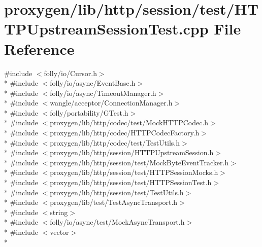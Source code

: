 \section{proxygen/lib/http/session/test/\+H\+T\+T\+P\+Upstream\+Session\+Test.cpp File Reference}
\label{HTTPUpstreamSessionTest_8cpp}
{\ttfamily \#include $<$folly/io/\+Cursor.\+h$>$}\\*
{\ttfamily \#include $<$folly/io/async/\+Event\+Base.\+h$>$}\\*
{\ttfamily \#include $<$folly/io/async/\+Timeout\+Manager.\+h$>$}\\*
{\ttfamily \#include $<$wangle/acceptor/\+Connection\+Manager.\+h$>$}\\*
{\ttfamily \#include $<$folly/portability/\+G\+Test.\+h$>$}\\*
{\ttfamily \#include $<$proxygen/lib/http/codec/test/\+Mock\+H\+T\+T\+P\+Codec.\+h$>$}\\*
{\ttfamily \#include $<$proxygen/lib/http/codec/\+H\+T\+T\+P\+Codec\+Factory.\+h$>$}\\*
{\ttfamily \#include $<$proxygen/lib/http/codec/test/\+Test\+Utils.\+h$>$}\\*
{\ttfamily \#include $<$proxygen/lib/http/session/\+H\+T\+T\+P\+Upstream\+Session.\+h$>$}\\*
{\ttfamily \#include $<$proxygen/lib/http/session/test/\+Mock\+Byte\+Event\+Tracker.\+h$>$}\\*
{\ttfamily \#include $<$proxygen/lib/http/session/test/\+H\+T\+T\+P\+Session\+Mocks.\+h$>$}\\*
{\ttfamily \#include $<$proxygen/lib/http/session/test/\+H\+T\+T\+P\+Session\+Test.\+h$>$}\\*
{\ttfamily \#include $<$proxygen/lib/http/session/test/\+Test\+Utils.\+h$>$}\\*
{\ttfamily \#include $<$proxygen/lib/test/\+Test\+Async\+Transport.\+h$>$}\\*
{\ttfamily \#include $<$string$>$}\\*
{\ttfamily \#include $<$folly/io/async/test/\+Mock\+Async\+Transport.\+h$>$}\\*
{\ttfamily \#include $<$vector$>$}\\*
